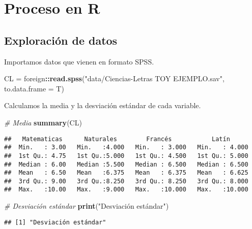 \documentclass[11pt,spanish,]{article}
\newenvironment{Shaded}{\begin{snugshade}}{\end{snugshade}}
\newcommand{\CommentTok}[1]{\textcolor[rgb]{0.56,0.35,0.01}{\textit{#1}}}
\newcommand{\DataTypeTok}[1]{\textcolor[rgb]{0.13,0.29,0.53}{#1}}
\newcommand{\KeywordTok}[1]{\textcolor[rgb]{0.13,0.29,0.53}{\textbf{#1}}}
\newcommand{\NormalTok}[1]{#1}
\newcommand{\OperatorTok}[1]{\textcolor[rgb]{0.81,0.36,0.00}{\textbf{#1}}}
\newcommand{\StringTok}[1]{\textcolor[rgb]{0.31,0.60,0.02}{#1}}
\begin{document}
\hypertarget{proceso-en-r}{%
\section{Proceso en R}\label{proceso-en-r}}

\hypertarget{exploracion-de-datos}{%
\subsection{Exploración de datos}\label{exploracion-de-datos}}

Importamos datos que vienen en formato SPSS.

\begin{Shaded}
\begin{Highlighting}[]
\NormalTok{CL =}\StringTok{ }\NormalTok{foreign}\OperatorTok{::}\KeywordTok{read.spss}\NormalTok{(}\StringTok{"data/Ciencias-Letras TOY EJEMPLO.sav"}\NormalTok{, }\DataTypeTok{to.data.frame =}\NormalTok{ T)}
\end{Highlighting}
\end{Shaded}

Calculamos la media y la desviación estándar de cada variable.

\begin{Shaded}
\begin{Highlighting}[]
\CommentTok{# Media}
\KeywordTok{summary}\NormalTok{(CL)}
\end{Highlighting}
\end{Shaded}

\begin{verbatim}
##   Matematicas      Naturales        Francés           Latín       
##  Min.   : 3.00   Min.   :4.000   Min.   : 3.000   Min.   : 4.000  
##  1st Qu.: 4.75   1st Qu.:5.000   1st Qu.: 4.500   1st Qu.: 5.000  
##  Median : 6.00   Median :5.500   Median : 6.500   Median : 6.500  
##  Mean   : 6.50   Mean   :6.375   Mean   : 6.375   Mean   : 6.625  
##  3rd Qu.: 9.00   3rd Qu.:8.250   3rd Qu.: 8.250   3rd Qu.: 8.000  
##  Max.   :10.00   Max.   :9.000   Max.   :10.000   Max.   :10.000
\end{verbatim}

\begin{Shaded}
\begin{Highlighting}[]
\CommentTok{# Desviación estándar}
\KeywordTok{print}\NormalTok{(}\StringTok{"Desviación estándar"}\NormalTok{)}
\end{Highlighting}
\end{Shaded}

\begin{verbatim}
## [1] "Desviación estándar"
\end{verbatim}
\end{document}

